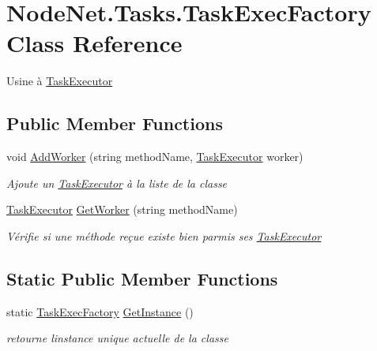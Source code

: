 \hypertarget{class_node_net_1_1_tasks_1_1_task_exec_factory}{}\section{Node\+Net.\+Tasks.\+Task\+Exec\+Factory Class Reference}
\label{class_node_net_1_1_tasks_1_1_task_exec_factory}


Usine à \hyperlink{class_node_net_1_1_tasks_1_1_task_executor}{Task\+Executor}  


\subsection*{Public Member Functions}
\begin{DoxyCompactItemize}
\item 
void \hyperlink{class_node_net_1_1_tasks_1_1_task_exec_factory_aa10759fa06564eae7d160da8f7ad3755}{Add\+Worker} (string method\+Name, \hyperlink{class_node_net_1_1_tasks_1_1_task_executor}{Task\+Executor} worker)
\begin{DoxyCompactList}\small\item\em Ajoute un \hyperlink{class_node_net_1_1_tasks_1_1_task_executor}{Task\+Executor} à la liste de la classe \end{DoxyCompactList}\item 
\hyperlink{class_node_net_1_1_tasks_1_1_task_executor}{Task\+Executor} \hyperlink{class_node_net_1_1_tasks_1_1_task_exec_factory_a81820ad209deb0ded20668f8c7799ba5}{Get\+Worker} (string method\+Name)
\begin{DoxyCompactList}\small\item\em Vérifie si une méthode reçue existe bien parmis ses \hyperlink{class_node_net_1_1_tasks_1_1_task_executor}{Task\+Executor} \end{DoxyCompactList}\end{DoxyCompactItemize}
\subsection*{Static Public Member Functions}
\begin{DoxyCompactItemize}
\item 
static \hyperlink{class_node_net_1_1_tasks_1_1_task_exec_factory}{Task\+Exec\+Factory} \hyperlink{class_node_net_1_1_tasks_1_1_task_exec_factory_ae4135c4e87468a9a4e920b55c251756c}{Get\+Instance} ()
\begin{DoxyCompactList}\small\item\em retourne l\textquotesingle{}instance unique actuelle de la classe \end{DoxyCompactList}\end{DoxyCompactItemize}


